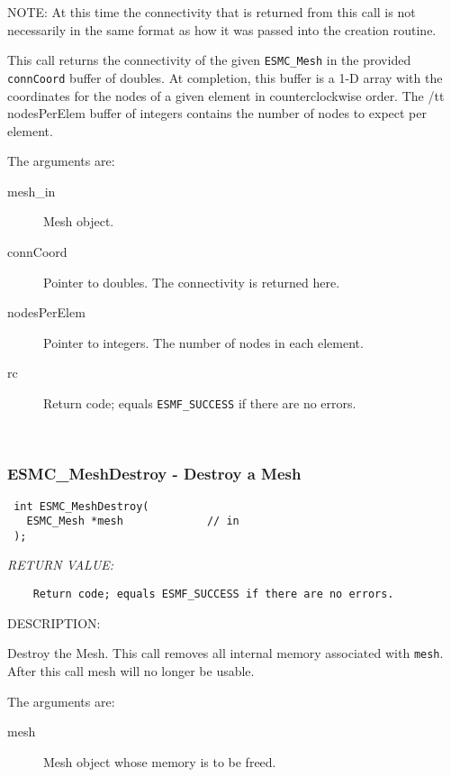   
    NOTE: At this time the connectivity that is returned from this call is
          not necessarily in the same format as how it was passed into the
          creation routine.
  
   This call returns the connectivity of the given {\tt ESMC\_Mesh}
   in the provided {\tt connCoord} buffer of doubles.  At completion, this
   buffer is a 1-D array with the coordinates for the nodes of a given element
   in counterclockwise order.  The {/tt nodesPerElem} buffer of integers
   contains the number of nodes to expect per element.
  
   The arguments are:
   \begin{description}
   \item[mesh\_in] Mesh object.
   \item[connCoord] Pointer to doubles.  The connectivity is returned here.
   \item[nodesPerElem] Pointer to integers.  The number of nodes in each
      element.
   \item[rc] Return code; equals {\tt ESMF\_SUCCESS} if there are no
   errors.
   \end{description}
   
 
\mbox{}\hrulefill\ 
 
\subsubsection [ESMC\_MeshDestroy] {ESMC\_MeshDestroy - Destroy a Mesh}


  
\begin{verbatim} int ESMC_MeshDestroy(
   ESMC_Mesh *mesh             // in
 );
 \end{verbatim}{\em RETURN VALUE:}
\begin{verbatim}    Return code; equals ESMF_SUCCESS if there are no errors.\end{verbatim}
{\sf DESCRIPTION:\\ }


    Destroy the Mesh. This call removes all internal memory associated with {\tt mesh}. After this call mesh will no longer be usable.
  
    The arguments are:
    \begin{description}
    \item[mesh]
      Mesh object whose memory is to be freed.
    \end{description}
   
